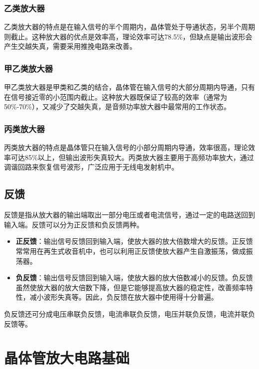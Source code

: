 \documentclass[12pt,UTF8]{ctexbook}
\begin{document}
\subsubsection{乙类放大器}
乙类放大器的特点是在输入信号的半个周期内，晶体管处于导通状态，另半个周期则截止。这种放大器的优点是效率高，理论效率可达78.5\%，但缺点是输出波形会产生交越失真，需要采用推挽电路来改善。

\subsubsection{甲乙类放大器}
甲乙类放大器是甲类和乙类的结合，晶体管在输入信号的大部分周期内导通，只有在信号接近零的小范围内截止。这种放大器既保证了较高的效率（通常为50\%-70\%），又减少了交越失真，是音频功率放大器中最常用的工作状态。

\subsubsection{丙类放大器}
丙类放大器的特点是晶体管只在输入信号的小部分周期内导通，效率很高，理论效率可达85\%以上，但输出波形失真较大。丙类放大器主要用于高频功率放大，通过调谐回路来恢复信号波形，广泛应用于无线电发射机中。

\subsection{反馈}

反馈是指从放大器的输出端取出一部分电压或者电流信号，通过一定的电路送回到输入端。反馈可以分为正反馈和负反馈两种。

\begin{itemize}[leftmargin=3.5em]
    \item \textbf{正反馈}：输出信号反馈回到输入端，使放大器的放大倍数增大的反馈。正反馈常常用在再生式收音机中，也可以利用正反馈使放大器产生自激振荡，做成振荡器。
    \item \textbf{负反馈}：输出信号反馈回到输入端，使放大器的放大倍数减小的反馈。负反馈虽然使放大器的放大倍数下降，但是它能够提高放大器的稳定性，改善频率特性，减小波形失真等。因此，负反馈在放大器中使用得十分普遍。
\end{itemize}

负反馈还可分成电压串联负反馈，电流串联负反馈，电压并联负反馈，电流并联负反馈等。

\section{晶体管放大电路基础}
\end{document}
